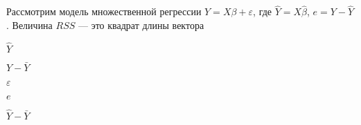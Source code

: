 
\begin{question}
Рассмотрим модель множественной регрессии \(Y=X\beta+\varepsilon\), где
\(\hat Y = X\hat\beta\), \(e=Y-\hat Y\). Величина \(RSS\) --- это
квадрат длины вектора
\begin{answerlist}
  \item \(\hat Y\)
  \item \(Y-\bar Y\)
  \item \(\varepsilon\)
  \item \(e\)
  \item \(\hat Y - \bar Y\)
\end{answerlist}
\end{question}


